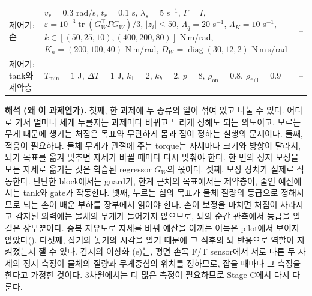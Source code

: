 \documentclass[11pt]{article}\usepackage[margin=1in]{geometry}\usepackage{amsmath,amssymb,amsthm,mathtools}\usepackage{graphicx}\graphicspath{{figures/}{../figures/}{figs/}{./}}\usepackage{enumitem}\usepackage{hyperref}\usepackage{cleveref}\usepackage{tikz}\usetikzlibrary{arrows.meta,positioning,calc,shapes.geometric}\usepackage{float}\usepackage{rotating}\usepackage[most]{tcolorbox}\usepackage{kotex}\usepackage{booktabs}\usepackage{longtable}\emergencystretch=1.6em\tolerance=2000 \crefname{assumption}{Assumption}{Assumptions}\Crefname{assumption}{Assumption}{Assumptions}\crefname{definition}{Definition}{Definitions}\Crefname{definition}{Definition}{Definitions}\crefname{proposition}{Proposition}{Propositions}\Crefname{proposition}{Proposition}{Propositions}\crefname{fact}{Fact}{Facts}\Crefname{fact}{Fact}{Facts} \newtheorem{assumption}{Assumption}\newtheorem{definition}{Definition}\newtheorem{lemma}{Lemma}\newtheorem{proposition}{Proposition}\newtheorem{theorem}{Theorem}\newtheorem{corollary}{Corollary}\newtheorem{fact}{Fact}\theoremstyle{remark}\newtheorem{remark}{Remark} \newcommand{\R}{\mathbb{R}}\newcommand{\xb}{\bar x}\newcommand{\Ab}{\bar A}\newcommand{\By}{\bar B_y}\newcommand{\U}{\mathcal U}\newcommand{\Z}{\mathcal Z}
\begin{document}
\begin{table}[H]
\begin{tabular}{p{3.9cm}p{6.2cm}p{4.6cm}}
제어기: 손 & {\raggedright $v_r=0.3$ rad/s, $t_r=0.1$ s, $\lambda_s=5$ s$^{-1}$, $\Gamma=I$, $\varepsilon=10^{-3}\operatorname{tr}(G_W^\top\Gamma G_W)/3$, $|z_i|\le50$, $\Lambda_q=20$ s$^{-1}$, $\Lambda_K=10$ s$^{-1}$, $k\in[(50,25,10),(400,200,80)]$ N\,m/rad, $K_n=(200,100,40)$ N\,m/rad, $D_W=\operatorname{diag}(30,12,2)$ N\,m\,s/rad\par} & -- \\
제어기: tank와 제약층 & $T_{\min}=1$ J, $\Delta T=1$ J, $k_1=2$, $k_b=2$, $p=8$, $\rho_{\mathrm{on}}=0.8$, $\rho_{\mathrm{full}}=0.9$ & -- \\
\bottomrule
\end{tabular}
\end{table}

\textbf{해석 (왜 이 과제인가).} 첫째, 한 과제에 두 종류의 일이 섞여 있고 나눌 수 있다. 어디로 가서 얼마나 세게 누를지는 과제마다 바뀌고 느리게 정해도 되는 의도이고, 모르는 무게 때문에 생기는 처짐은 목표와 무관하게 몸과 짐이 정하는 실행의 문제이다. 둘째, 적응이 필요하다. 물체 무게가 관절에 주는 torque는 자세마다 크기와 방향이 달라서, 뇌가 목표를 옮겨 맞추면 자세가 바뀔 때마다 다시 맞춰야 한다. 한 번의 정지 보정을 모든 자세로 옮기는 것은 학습된 regressor $G_W$의 몫이다. 셋째, 보장 장치가 실제로 작동한다. 단단한 block에서는 guard가, 한계 근처의 목표에서는 제약층이, 줄인 예산에서는 tank와 gate가 작동한다. 넷째, 누르는 힘의 목표가 물체 질량의 등급으로 정해지므로 뇌는 손이 배운 부하를 장부에서 읽어야 한다. 손이 보정을 마치면 처짐이 사라지고 감지된 외력에는 물체의 무게가 들어가지 않으므로, 뇌의 순간 관측에서 등급을 알 길은 장부뿐이다. 중복 자유도로 자세를 바꿔 예산을 아끼는 이득은 pilot에서 보이지 않았다(). 다섯째, 잡기와 놓기의 시각을 알기 때문에 그 직후의 뇌 반응으로 역할이 지켜졌는지 잴 수 있다. 감지의 이상화 (e)는, 평면 손목 F/T sensor에서 서로 다른 두 자세의 정지 측정이 물체의 질량과 무게중심의 위치를 정하므로, 잡을 때마다 그 측정을 한다고 가정한 것이다. 3차원에서는 더 많은 측정이 필요하므로 Stage C에서 다시 다룬다.
\end{document}
